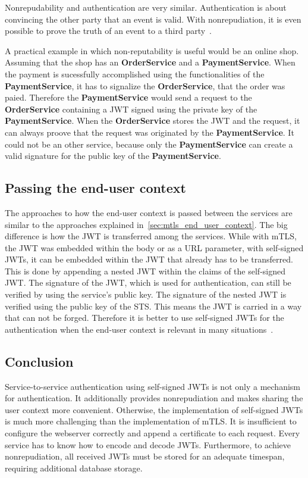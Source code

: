 Nonrepudability and authentication are very similar.
Authentication is about convincing the other party that an event is valid.
With nonrepudiation, it is even possible to prove the truth of an event to a third party~\cite{wu20131200}.

A practical example in which non-reputability is useful would be an online shop.
Assuming that the shop has an \textbf{OrderService} and a \textbf{PaymentService}.
When the payment is sucessfully accomplished using the functionalities of the \textbf{PaymentService}, it has to signalize the \textbf{OrderService}, that the order was paied.
Therefore the \textbf{PaymentService} would send a request to the \textbf{OrderService} containing a JWT signed using the private key of the \textbf{PaymentService}.
When the \textbf{OrderService} stores the JWT and the request, it can always proove that the request was originated by the \textbf{PaymentService}.
It could not be an other service, because only the \textbf{PaymentService} can create a valid signature for the public key of the \textbf{PaymentService}.

\subsection{Passing the end-user context}
The approaches to how the end-user context is passed between the services are similar to the approaches explained in~\ref{sec:mtls_end_user_context}.
The big difference is how the JWT is transferred among the services.
While with mTLS, the JWT was embedded within the body or as a URL parameter, with self-signed JWTs, it can be embedded within the JWT that already has to be transferred.
This is done by appending a nested JWT within the claims of the self-signed JWT.
The signature of the JWT, which is used for authentication, can still be verified by using the service's public key.
The signature of the nested JWT is verified using the public key of the STS.
This means the JWT is carried in a way that can not be forged.
Therefore it is better to use self-signed JWTs for the authentication when the end-user context is relevant in many situations~\cite{dias2020microservices}.

\subsection{Conclusion}
Service-to-service authentication using self-signed JWTs is not only a mechanism for authentication. It additionally provides nonrepudiation and makes sharing the user context more convenient. 
Otherwise, the implementation of self-signed JWTs is much more challenging than the implementation of mTLS.
It is insufficient to configure the webserver correctly and append a certificate to each request.
Every service has to know how to encode and decode JWTs.
Furthermore, to achieve nonrepudiation, all received JWTs must be stored for an adequate timespan, requiring additional database storage.

